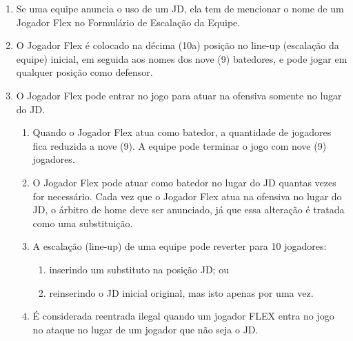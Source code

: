 \begin{enumerate}[label=(\alph*)]
	\item Se uma equipe anuncia o uso de um JD, ela tem de mencionar o nome de um Jogador Flex no Formulário de Escalação da Equipe.
	\item O Jogador Flex é colocado na décima (10a) posição no \gls{line-up} (escalação da equipe) inicial, em seguida aos nomes dos nove (9) batedores, e pode jogar em qualquer posição como defensor.
	\item O Jogador Flex pode entrar no jogo para atuar na ofensiva somente no lugar do JD.
	\begin{enumerate}[label=\roman*.]
		\item Quando o Jogador Flex atua como batedor, a quantidade de jogadores fica  reduzida a nove (9). A equipe pode terminar o jogo com nove (9) jogadores.
		\item O Jogador Flex pode atuar como batedor no lugar do JD quantas vezes for necessário. Cada vez que o Jogador Flex atua na ofensiva no lugar do JD, o árbitro de \gls{home} deve ser anunciado, já que essa alteração é tratada como uma  substituição.
		\item A escalação (\gls{line-up}) de uma equipe pode reverter para 10 jogadores:

		\begin{enumerate}[label=\arabic*)]
			\item inserindo um substituto na posição JD; ou
 			\item reinserindo o JD inicial original, mas isto apenas por uma vez.
 	\end{enumerate}

	\item  É considerada reentrada ilegal quando um jogador FLEX entra no jogo no ataque no lugar de um jogador que não seja o JD.
\end{enumerate}
\end{enumerate}
